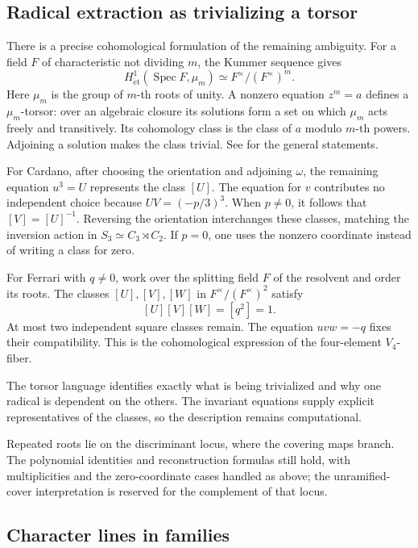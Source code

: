 \documentclass[11pt]{article}
\theoremstyle{remark}
\newcommand{\Spec}{\operatorname{Spec}}
\newcommand{\et}{\mathrm{\acute et}}
\begin{document}
\subsection{Radical extraction as trivializing a torsor}

There is a precise cohomological formulation of the remaining ambiguity. For a field \(F\) of characteristic not dividing \(m\), the Kummer sequence gives
\begin{equation}
H^1_{\et}(\Spec F,\mu_m)\simeq F^\times/(F^\times)^m.
\label{eq:kummer}
\end{equation}
Here \(\mu_m\) is the group of \(m\)-th roots of unity. A nonzero equation \(z^m=a\) defines a \(\mu_m\)-torsor: over an algebraic closure its solutions form a set on which \(\mu_m\) acts freely and transitively. Its cohomology class is the class of \(a\) modulo \(m\)-th powers. Adjoining a solution makes the class trivial. See \cite{stacks-kummer,stacks-torsors} for the general statements.

For Cardano, after choosing the orientation and adjoining \(\omega\), the remaining equation \(u^3=U\) represents the class \([U]\). The equation for \(v\) contributes no independent choice because \(UV=(-p/3)^3\). When \(p\ne0\), it follows that \([V]=[U]^{-1}\). Reversing the orientation interchanges these classes, matching the inversion action in \(S_3\simeq C_3\rtimes C_2\). If \(p=0\), one uses the nonzero coordinate instead of writing a class for zero.

For Ferrari with \(q\ne0\), work over the splitting field \(F\) of the resolvent and order its roots. The classes \([U],[V],[W]\) in \(F^\times/(F^\times)^2\) satisfy
\[
[U][V][W]=[q^2]=1.
\]
At most two independent square classes remain. The equation \(uvw=-q\) fixes their compatibility. This is the cohomological expression of the four-element \(V_4\)-fiber.

The torsor language identifies exactly what is being trivialized and why one radical is dependent on the others. The invariant equations supply explicit representatives of the classes, so the description remains computational.

Repeated roots lie on the discriminant locus, where the covering maps branch. The polynomial identities and reconstruction formulas still hold, with multiplicities and the zero-coordinate cases handled as above; the unramified-cover interpretation is reserved for the complement of that locus.


\subsection{Character lines in families}
\end{document}
